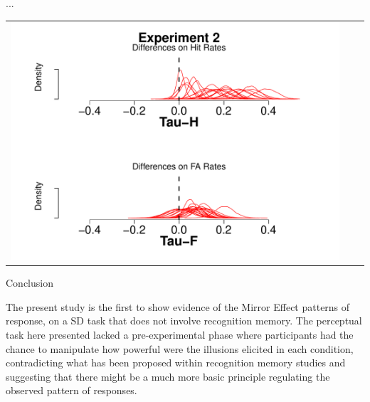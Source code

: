 \documentclass[final]{beamer}
\newlength{\onecolwid}
\begin{document}
\begin{frame}[t]
\begin{columns}[t]
\begin{column}{\onecolwid}
\begin{alertblock}{...}
\begin{center}
\begin{tabular}{ccc}
\includegraphics[width=0.6\linewidth]{Figures/Tau_2.pdf}
\end{tabular}
\end{center}



\end{alertblock}



\begin{alertblock}{Conclusion}

The present study is the first to show evidence of the Mirror Effect patterns of response, on a SD task that does not involve recognition memory. The perceptual task here presented lacked a pre-experimental phase where participants had the chance to manipulate how powerful were the illusions elicited in each condition, contradicting what has been proposed within recognition memory studies and suggesting that there might be a much more basic principle regulating the observed pattern of responses.


\end{alertblock}
\end{column}
\end{columns}
\end{frame}
\end{document}
